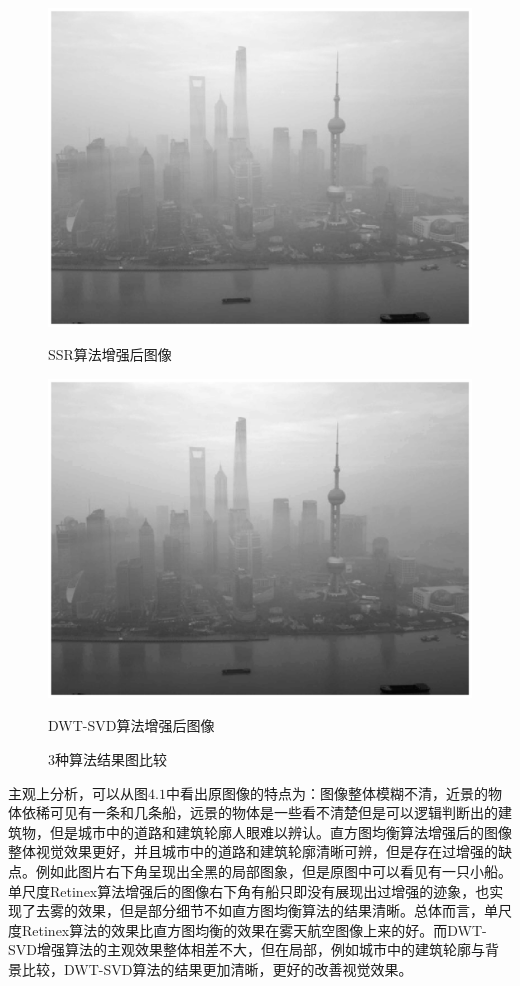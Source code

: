 \documentclass[12pt]{book}
\begin{document}
\begin{figure}[!ht]
					\begin{minipage}{0.48\linewidth}
						\centerline{\includegraphics[width=1\textwidth]{./figures/ssr11.eps}}
						\centerline{SSR算法增强后图像}
					\end{minipage}
					\qquad
					\begin{minipage}{0.48\linewidth}
						\centerline{\includegraphics[width=1\textwidth]{./figures/DWTSVD11.eps}}
						\centerline{DWT-SVD算法增强后图像}
					\end{minipage}
					\caption{3种算法结果图比较\label{ }}
				\end{figure}

主观上分析，可以从图$4.1$中看出原图像的特点为：图像整体模糊不清，近景的物体依稀可见有一条和几条船，远景的物体是一些看不清楚但是可以逻辑判断出的建筑物，但是城市中的道路和建筑轮廓人眼难以辨认。直方图均衡算法增强后的图像整体视觉效果更好，并且城市中的道路和建筑轮廓清晰可辨，但是存在过增强的缺点。例如此图片右下角呈现出全黑的局部图象，但是原图中可以看见有一只小船。单尺度Retinex算法增强后的图像右下角有船只即没有展现出过增强的迹象，也实现了去雾的效果，但是部分细节不如直方图均衡算法的结果清晰。总体而言，单尺度Retinex算法的效果比直方图均衡的效果在雾天航空图像上来的好。而DWT-SVD增强算法的主观效果整体相差不大，但在局部，例如城市中的建筑轮廓与背景比较，DWT-SVD算法的结果更加清晰，更好的改善视觉效果。
\end{document}

